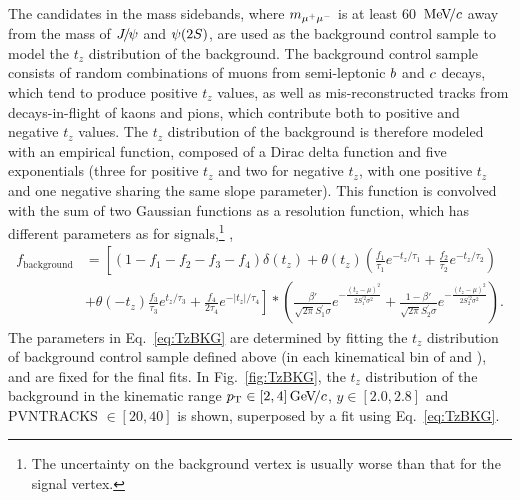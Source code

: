 The candidates in the mass sidebands, where $m_{{\mu^+\mu^-}}$ is at least 60 $\text{\,Me\kern -0.1em V\!/}c$ away from the mass of ${{J\mskip -3mu/\mskip -2mu\psi}}$ and ${\psi{(2S)}}$, are used as the background control sample to model the $t_z$ distribution of the background.
The background control sample consists of random combinations of muons from semi-leptonic ${b}$ and ${c}$ decays, which tend to produce positive $t_z$ values, as well as mis-reconstructed tracks from decays-in-flight of kaons and pions, which contribute both to positive and negative $t_z$ values.
The $t_z$ distribution of the background is therefore modeled with an empirical function, composed of a Dirac delta function and five exponentials (three for positive $t_z$ and two for negative $t_z$, with one positive $t_z$ and one negative sharing the same slope parameter). 
This function is convolved with the sum of two Gaussian functions as a resolution function, which has different parameters as for signals,\footnote{The uncertainty on the background vertex is usually worse than that for the signal vertex. } ,
\begin{align}
f_\mathrm{background} &=
\left[(1-f_1-f_2-f_3-f_4)\delta(t_z)+\theta(t_z)(\frac{f_1}{\tau_1}e^{-t_z/\tau_1}+\frac{f_2}{\tau_2}e^{-t_z/\tau_2})\right.
\nonumber\\
&\left. +\theta(-t_z)\frac{f_3}{\tau_3}e^{t_z/\tau_3}+\frac{f_4}{2\tau_4}e^{-|t_z|/\tau_4}
\right]\ast \left(\frac{\beta'}{\sqrt{2\pi}S^{'}_1\sigma} e^{-\frac{(t_z-\mu)^2}{2S^{'2}_1\sigma^2}}
  +\frac{1-\beta'}{\sqrt{2\pi}S^{'}_2\sigma} e^{-\frac{(t_z-\mu)^2}{2S^{'2}_2\sigma^2}}\right). 
\label{eq:TzBKG}
\end{align}
The parameters in Eq.~\ref{eq:TzBKG} are determined by fitting the $t_z$ distribution of background control sample defined above (in each kinematical bin of \jpsi and \psitwos), and are fixed for the final fits. 
In Fig.~\ref{fig:TzBKG}, the $t_z$ distribution of the background in the kinematic range $p_{\mathrm{T}}\in[2,4]\text{\,Ge\kern -0.1em V\!/}c$, $y\in[2.0,2.8]$ and PVNTRACKS $\in[20,40]$ is shown, superposed by a fit using Eq.~\ref{eq:TzBKG}. 
